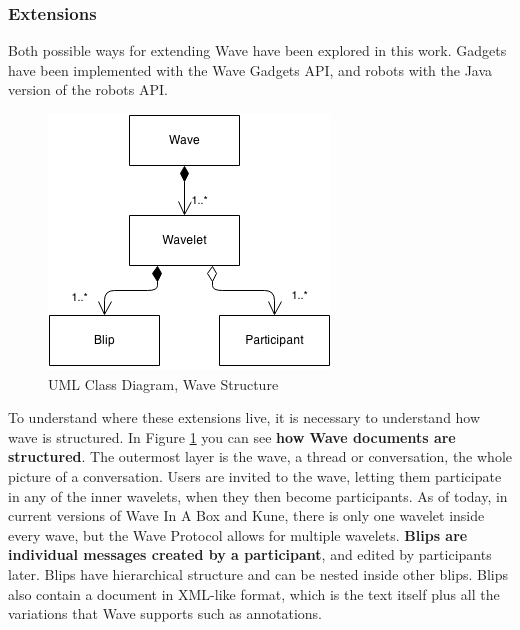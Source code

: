 \subsubsection{Extensions}
Both possible ways for extending Wave have been explored in this work. Gadgets have been implemented with the Wave Gadgets API, and robots with the Java version of the robots API.
\begin{figure}[h]
  \center
    \includegraphics[keepaspectratio, scale=0.7]{Media/Diagrams/Wave/Structure.png}
  \caption{UML Class Diagram, Wave Structure}
  \label{fig:wave_structure}
\end{figure}
To understand where these extensions live, it is necessary to understand how wave is structured. In Figure \ref{fig:wave_structure} you can see \textbf{how Wave documents are structured}. The outermost layer is the wave, a thread or conversation, the whole picture of a conversation. Users are invited to the wave, letting them participate in any of the inner wavelets, when they then become participants. As of today, in current versions of Wave In A Box and Kune, there is only one wavelet inside every wave, but the Wave Protocol allows for multiple wavelets. \textbf{Blips are individual messages created by a participant}, and edited by participants later. Blips have hierarchical structure and can be nested inside other blips. Blips also contain a document in XML-like format, which is the text itself plus all the variations that Wave supports such as annotations.

